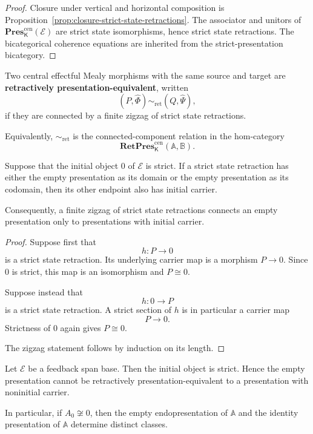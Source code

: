 \begin{proof}
Closure under vertical and horizontal composition is
Proposition~\ref{prop:closure-strict-state-retractions}.  The associator and
unitors of
\(\mathbf{Pres}^{\mathrm{cen}}_{\mathsf K}(\mathcal E)\)
are strict state isomorphisms, hence strict state retractions.  The
bicategorical coherence equations are inherited from the strict-presentation
bicategory.
\end{proof}

\begin{definition}
\label{def:retractive-presentation-equivalence}
Two central effectful Mealy morphisms with the same source and target are
\textbf{retractively presentation-equivalent}, written
\[
    (P,\widehat\Phi)
    \sim_{\mathrm{ret}}
    (Q,\widehat\Psi),
\]
if they are connected by a finite zigzag of strict state retractions.

Equivalently,
\(\sim_{\mathrm{ret}}\) is the connected-component relation in the
hom-category
\[
    \mathbf{RetPres}^{\mathrm{cen}}_{\mathsf K}
    (\mathbb A,\mathbb B).
\]
\end{definition}

\begin{proposition}
\label{prop:empty-retractive-class-isolated}
Suppose that the initial object \(0\) of \(\mathcal E\) is strict.  If a
strict state retraction has either the empty presentation as its domain or
the empty presentation as its codomain, then its other endpoint also has
initial carrier.

Consequently, a finite zigzag of strict state retractions connects an empty
presentation only to presentations with initial carrier.
\end{proposition}

\begin{proof}
Suppose first that
\[
    h:P\longrightarrow0
\]
is a strict state retraction.  Its underlying carrier map is a morphism
\(P\to0\).  Since \(0\) is strict, this map is an isomorphism and
\(P\cong0\).

Suppose instead that
\[
    h:0\longrightarrow P
\]
is a strict state retraction.  A strict section of \(h\) is in particular a
carrier map
\[
    P\longrightarrow0.
\]
Strictness of \(0\) again gives \(P\cong0\).

The zigzag statement follows by induction on its length.
\end{proof}

\begin{corollary}
\label{cor:retractive-quotient-noncollapse}
Let \(\mathcal E\) be a feedback span base.  Then the initial object is
strict.  Hence the empty presentation cannot be retractively
presentation-equivalent to a presentation with noninitial carrier.

In particular, if \(A_0\not\cong0\), then the empty endopresentation of
\(\mathbb A\) and the identity presentation of \(\mathbb A\) determine
distinct classes.
\end{corollary}

